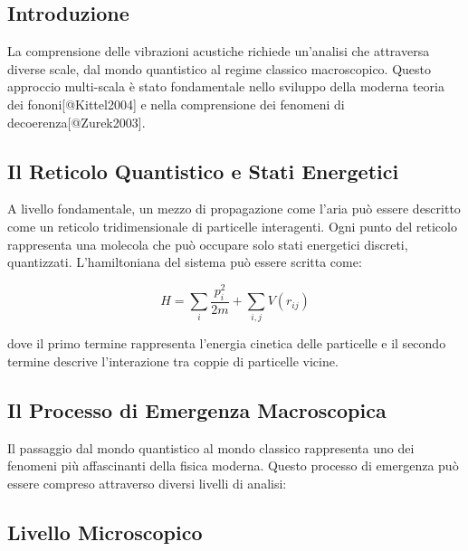 \documentclass[a4paper,11pt]{article}
\begin{document}
\subsection{Introduzione}\hypertarget{introduzione}{}\label{introduzione}

La comprensione delle vibrazioni acustiche richiede un'analisi che
attraversa diverse scale, dal mondo quantistico al regime classico
macroscopico. Questo approccio multi-scala è stato fondamentale nello
sviluppo della moderna teoria dei fononi{[}@Kittel2004{]} e nella
comprensione dei fenomeni di decoerenza{[}@Zurek2003{]}.

\subsection{Il Reticolo Quantistico e Stati Energetici}\hypertarget{il-reticolo-quantistico-e-stati-energetici}{}\label{il-reticolo-quantistico-e-stati-energetici}

A livello fondamentale, un mezzo di propagazione come l'aria può essere
descritto come un reticolo tridimensionale di particelle interagenti.
Ogni punto del reticolo rappresenta una molecola che può occupare solo
stati energetici discreti, quantizzati. L'hamiltoniana del sistema può
essere scritta come:

\begin{displaymath}
H = \sum_i \frac{p_i^2}{2m} + \sum_{i,j} V(r_{ij})
\end{displaymath}

dove il primo termine rappresenta l'energia cinetica delle particelle e
il secondo termine descrive l'interazione tra coppie di particelle
vicine.

\subsection{Il Processo di Emergenza Macroscopica}\hypertarget{il-processo-di-emergenza-macroscopica}{}\label{il-processo-di-emergenza-macroscopica}

Il passaggio dal mondo quantistico al mondo classico rappresenta uno dei
fenomeni più affascinanti della fisica moderna. Questo processo di
emergenza può essere compreso attraverso diversi livelli di analisi:

\subsection{Livello Microscopico}\hypertarget{livello-microscopico}{}\label{livello-microscopico}
\end{document}
